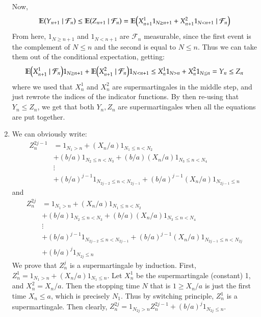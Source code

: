 \documentclass[12pt]{article}
\theoremstyle{definitionstyle}
\newcommand{\1}{\mathds 1}
\newcommand{\E}{\mathbb E \qty}
\begin{document}
\begin{enumerate}
        Now,
        \begin{align*}
            \E(Y_{n+1} \mid \mathcal F_n) \leq \E(Z_{n+1} \mid \mathcal F_n) = \E(X^1_{n+1} 1_{N \geq n+1} + X^2_{n+1} 1_{N < n+1} \mid \mathcal F_n)
        \end{align*}
        From here, $1_{N \geq n+1}$ and $1_{N < n+1}$ are $\mathcal F_n$ measurable, since the first event is the complement of $N \leq n$ and the second is equal to $N \leq n$. Thus we can take them out of the conditional expectation, getting:
        \begin{align*}
            \E(X^1_{n+1}  \mid \mathcal F_n)1_{N \geq n+1} + \E(X^2_{n+1} \mid \mathcal F_n)1_{N < n+1} \leq X^1_n 1_{N > n} + X^2_n 1_{N \leq n} = Y_n \leq Z_n
        \end{align*}
        where we used that $X^1_n$ and $X^2_n$ are supermartingales in the middle step, and just rewrote the indices of the indicator functions. By then re-using that $Y_n \leq Z_n$, we get that both $Y_n, Z_n$ are supermartingales when all the equations are put together.

        \item We can obviously write:
        \begin{align*}
            Z^{2j-1}_n &= 1_{N_1 > n} + (X_n/a)1_{N_1 \leq n < N_2} \\
            &+ (b/a)1_{N_2 \leq n < N_3} + (b/a) (X_n/a) 1_{N_3 \leq n < N_4} \\ 
            &\vdots \\
            &+ (b/a)^{j-1} 1_{N_{2j-2} \leq n < N_{2j-1}} + (b/a)^{j-1} (X_n/a) 1_{N_{2j-1} \leq n}
        \end{align*}
        and
        \begin{align*}
            Z^{2j}_n &= 1_{N_1 > n} + (X_n/a)1_{N_1 \leq n < N_2} \\
            &+ (b/a)1_{N_2 \leq n < N_3} + (b/a) (X_n/a) 1_{N_3 \leq n < N_4} \\ 
            &\vdots \\
            &+ (b/a)^{j-1} 1_{N_{2j-2} \leq n < N_{2j-1}} + (b/a)^{j-1} (X_n/a) 1_{N_{2j-1} \leq n < N_{2j}} \\
            &+ (b/a)^{j} 1_{N_{2j} \leq n}
        \end{align*}
        We prove that $Z^j_n$ is a supermartingale by induction. First, $Z^1_n = 1_{N_1 > n} + (X_n/a)1_{N_1 \leq n}$. Let $X^1_n$ be the supermartingale (constant) 1, and $X^2_n = X_n/a$. Then the stopping time $N$ that is $1 \geq X_n/a$ is just the first time $X_n \leq a$, which is precisely $N_1$. Thus by switching principle, $Z^1_n$ is a supermartingale. Then clearly, $Z^{2j}_n = 1_{N_{2j} > n} Z^{2j-1}_n + (b/a)^j 1_{N_{2j} \leq n}$. 


\end{enumerate}
\end{document}
